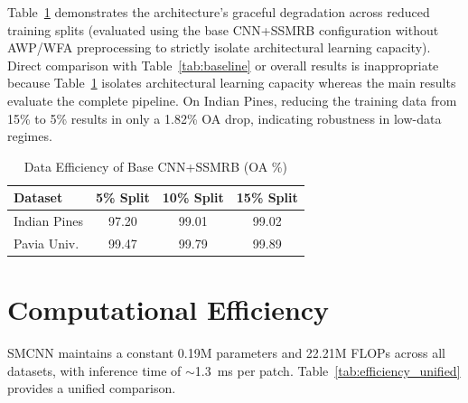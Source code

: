 \documentclass[conference]{IEEEtran}
\begin{document}
{{Table~\ref{tab:data_eff} demonstrates the architecture's graceful degradation across reduced training splits (evaluated using the base CNN+SSMRB configuration without AWP/WFA preprocessing to strictly isolate architectural learning capacity). Direct comparison with Table~\ref{tab:baseline} or overall results is inappropriate because Table~\ref{tab:data_eff} isolates architectural learning capacity whereas the main results evaluate the complete pipeline. On Indian Pines, reducing the training data from 15\% to 5\% results in only a 1.82\% OA drop, indicating robustness in low-data regimes.

\begin{table}[!h]
\caption{Data Efficiency of Base CNN+SSMRB (OA \%)}
\label{tab:data_eff}
\centering
\begin{tabular}{lccc}
\toprule
\textbf{Dataset} & \textbf{5\% Split} & \textbf{10\% Split} & \textbf{15\% Split} \\
\midrule
Indian Pines & 97.20 & 99.01 & 99.02 \\
Pavia Univ. & 99.47 & 99.79 & 99.89 \\
\bottomrule
\end{tabular}
\end{table}

\section{Computational Efficiency}

SMCNN maintains a constant 0.19M parameters and 22.21M FLOPs across all datasets, with inference time of $\sim$1.3~ms per patch. Table~\ref{tab:efficiency_unified} provides a unified comparison.

\begin{table}[!t]
\caption{Unified Efficiency Comparison}
\label{tab:efficiency_unified}
\centering
{}
\end{table}

}}
\end{document}
